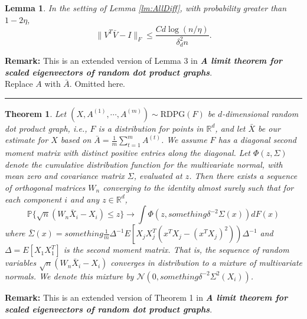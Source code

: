 \documentclass[a4paper]{article}
\newenvironment{proof}{{\bf Proof:  }}{\hfill\rule{2mm}{2mm}}
\newtheorem{lemma}[fact]{Lemma}
\newtheorem{theorem}[fact]{Theorem}
\begin{document}
\begin{lemma}
\label{lm:VVhatDiff}
In the setting of Lemma \ref{lm:AllDiff}, with probability greater than $1-2\eta$,
\[
	\|V^T \bar{V} - I \|_F \le \frac{C d \log(n/\eta)}{\delta_d^2 n}.
\]
\end{lemma}
\textbf{Remark:} This is an extended version of Lemma 3 in \textbf{\textit{A limit theorem for scaled eigenvectors of random dot product graphs}}. \\
\begin{proof}
Replace $A$ with $\bar{A}$. Omitted here.
\end{proof}







\begin{theorem}
\label{thm:clt}
Let $(X, A^{(1)}, \cdots, A^{(m)}) \sim \mathrm{RDPG}(F)$ be $d$-dimensional random dot product graph, i.e., $F$ is a distribution for points in $\mathbb{R}^d$, and let $\bar{X}$ be our estimate for $X$ based on $\bar{A} = \frac{1}{m} \sum_{t = 1}^m A^{(t)}$. We assume $F$ has a diagonal second moment matrix with distinct positive entries along the diagonal. Let $\Phi(z, \Sigma)$ denote the cumulative distribution function for the multivariate normal, with mean zero and covariance matrix $\Sigma$, evaluated at $z$. Then there exists a sequence of orthogonal matrices $W_n$ converging to the identity almost surely such that for each component $i$ and any $z \in \mathbb{R}^d$,
\[
	\mathbb{P}\{ \sqrt{n}(W_n \bar{X}_i - X_i) \le z \} \rightarrow \int \Phi(z, something \delta^{-2} \Sigma(x)) dF(x)
\]
where $\bar{\Sigma}(x) = something \frac{1}{m} \Delta^{-1} E \left[ X_j X_j^T (x^T X_j - (x^T X_j)^2 ) \right) \Delta^{-1}$ and $\Delta = E[X_1 X_1^T]$ is the second moment matrix. That is, the sequence of random variables $\sqrt{n}(W_n \bar{X}_i - X_i)$ converges in distribution to a mixture of multivariate normals. We denote this mixture by $\mathcal{N}(0, something \delta^{-2} \Sigma^2(X_i))$.
\end{theorem}
\textbf{Remark:} This is an extended version of Theorem 1 in \textbf{\textit{A limit theorem for scaled eigenvectors of random dot product graphs}}. \\
\end{document}
